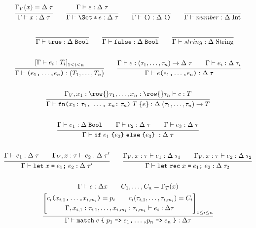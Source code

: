 \begin{gather*}
    \infer{
        \Gamma \vdash x : \Delta\;\tau
    }{
        \Gamma_V(x) = \Delta\;\tau
    }
    \qquad
    \infer{
        \Gamma \vdash \S{e} : \Delta\;\tau
    }{
        \Gamma \vdash e : \Delta\;\tau
    }
    \qquad
    \infer{
        \Gamma \vdash \unit: \Delta\;\unit
    }{}
    \qquad
    \infer{
        \Gamma \vdash number : \Delta\;\mcode{Int}
    }{}
    \\\\
    \qquad
    \infer{\Gamma \vdash \true : \Delta\;\Bool}{}
    \qquad
    \infer{\Gamma \vdash \false : \Delta\;\Bool}{}
    \qquad
    \infer{
        \Gamma \vdash string : \Delta\;\mcode{String}
    }{}
    \\\\
    \infer{
        \Gamma \vdash \tok{(} e_1\tok{,} \dots\tok{,} e_n\tok{)} : (T_1, \dots, T_n)
    }{
        \left[ \Gamma \vdash e_i : T_i \right]_{1\leq i\leq n}
    }
    \qquad
    \infer{
        \Gamma \vdash e\tok{(}e_1\tok{,} \dots\tok{,} e_n\tok{)}: \Delta\;\tau
    }{
        \Gamma \vdash e: (\tau_1, \dots, \tau_n) \to \Delta\;\tau
        \qquad
        \Gamma \vdash e_i : \Delta\;\tau_i
    }
    \\\\
    \infer{
        \Gamma \vdash \fn\tok{(}x_1\tok{:}\;\tau_1\tok{,}\;\dots\tok{,}\;x_n\tok{:}\;\tau_n\tok{)}\;T\; \{e\}: \Delta\;(\tau_1,\dots, \tau_n) \to T
    }{
        \Gamma_V, x_1: \row{}\tau_1, \dots, x_n: \row{}\tau_n \vdash c : T
    }
    \\\\
    \infer{
        \Gamma \vdash \cond{e_1}{e_2}{e_3} : \Delta\;\tau
    }{
        \Gamma \vdash e_1 : \Delta\;\Bool
        \qquad
        \Gamma \vdash e_2 : \Delta\;\tau
        \qquad
        \Gamma \vdash e_3 : \Delta\;\tau
    }
    \\\\
    \infer{
        \Gamma \vdash \kw{let}\;x\;\tok{=}\;e_1\tok{;}\;e_2 : \Delta\;\tau'
    }{
        \Gamma \vdash e_1 : \Delta\;\tau
        \qquad
        \Gamma_V, x: \tau \vdash e_2 : \Delta\;\tau'
    }
    \qquad
    \infer{
        \Gamma \vdash \kw{let}\;\kw{rec}\;x\;\tok{=}\;e_1\tok{;}\;e_2 : \Delta\;\tau_2
    }{
        \Gamma_V, x: \tau \vdash e_1 : \Delta\;\tau_1
        \qquad
        \Gamma_V, x: \tau \vdash e_2 : \Delta\;\tau_2
    }
    \\\\
    \infer{
        \Gamma \vdash \kw{match}\;e\;\tok{\{}\;p_1\;\kw{=>}\; e_1\tok{,}\dots\tok{,} p_n\;\kw{=>}\;e_n\;\tok{\}} : \Delta\tau
    }{
        \Gamma \vdash e: \Delta x \qquad C_1,\dots,C_n = \Gamma_T(x)\\
        \left[
            \begin{gathered}
                c_i\tok{(}x_{i,1}\tok{,} \dots\tok{,} x_{i,m_i}\tok{)} = p_i\qquad c_i(\tau_{i,1}, \dots, \tau_{i,m_i}) = C_i
                \\
                \Gamma, x_{i,1} : \tau_{i,1}, \dots, x_{i,m_i} : \tau_{i,m_i} \vdash e_i : \Delta\tau
            \end{gathered}
        \right]_{1\leq i\leq n}
    }
\end{gather*}

